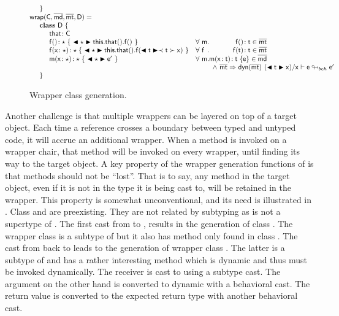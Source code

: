 \documentclass[a4paper,USenglish]{tex/lipics-v2016}
\begin{document}
\begin{figure}[!ht]
\[\begin{array}{@{}ll@{}l@{}r@{~}c@{~}r}
\SP \}
\\
\wrapAny\C\bmd\bmt\D = \\
\SP \class~\D~\{\\
\SPP \Fdef \that \C\\ 
\SPP   \Mdefz\f\any{~\BehCast\any{\Get{{\Get\this\that}}\f}~}
&  \All \m  \Mtype\f{}\t \in \bmt\\
\SPP   \Mdef\f\x\any\any{~\BehCast\any{\Set{\Get\this\that}\f{\bscast\t\x}}~}
&  \All \f  \Mtype\f\t\t \in \bmt\\
\SPP   \Mdef\m\x\any\any {~\BehCast\any{{\ep}}~}
&  \All \m \Mdef\m\x\t\t\e\in\b\md \\
&&&\multicolumn{3}{l}{\wedge~\rtranst{\bmt}{\dyn{\bmt}}{(\BehCast\t\x)}\x{\e}{\ep}}
\\
\SP \}\\
\end{array}\]
\hrulefill
  \caption{Wrapper class generation.}\label{wrap}
\end{figure}

Another challenge is that multiple wrappers can be layered on top of a target object. Each time a
reference crosses a boundary between typed and untyped code, it will accrue
an additional wrapper. When a method is invoked on a wrapper chair, that
method will be invoked on every wrapper, until finding its way to the target
object. A key property of the wrapper generation functions of 
is that methods should not be ``lost''. That is to say, any method in the
target object, even if it is not in the type it is being cast to, will be
retained in the wrapper.  This property is somewhat unconventional, and its
need is illustrated in . Class \C and \D are preexisting.  They
are not related by subtyping as \any is not a supertype of \E. The first
cast from \C to \D, results in the generation of class . The
wrapper class is a subtype of \D but it also has method \mp only found in
class \C.  The cast from  back to \C leads to the generation of
wrapper class . The latter is a subtype of \C and has a rather
interesting method \m which is dynamic and thus must be invoked dynamically.
The receiver is cast to \any using a subtype cast. The argument on the other
hand is converted to dynamic with a behavioral cast. The return value is
converted to the expected return type with another behavioral cast.
\end{document}
